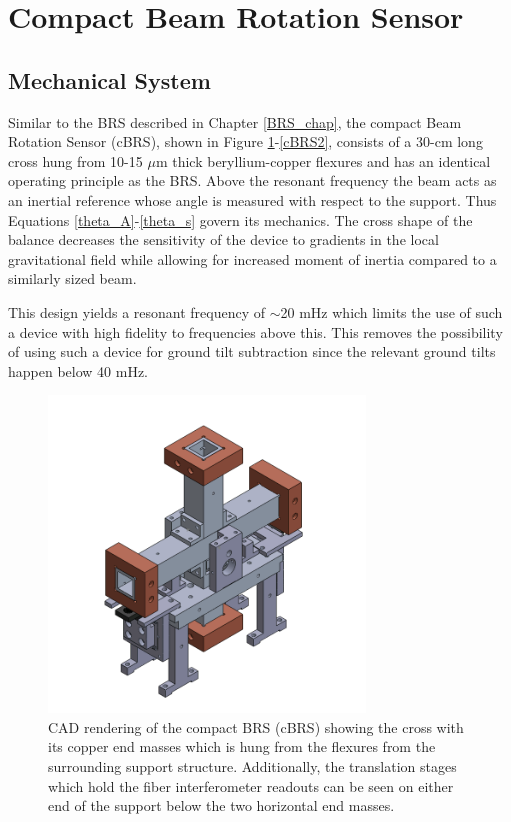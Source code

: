 \documentclass [12pt, proquest]{uwthesis}[2019]
\begin{document}
\section{Compact Beam Rotation Sensor} \label{cBRSSec}
\subsection{Mechanical System}

Similar to the BRS described in Chapter \ref{BRS_chap}, the compact Beam Rotation Sensor (cBRS), shown in Figure \ref{cBRS1}-\ref{cBRS2}, consists of a 30-cm long cross hung from 10-15 $\mu$m thick beryllium-copper flexures and has an identical operating principle as the BRS. Above the resonant frequency the beam acts as an inertial reference whose angle is measured with respect to the support. Thus Equations \ref{theta_A}-\ref{theta_s} govern its mechanics. The cross shape of the balance decreases the sensitivity of the device to gradients in the local gravitational field while allowing for increased moment of inertia compared to a similarly sized beam. 

This design yields a resonant frequency of $\sim$20 mHz which limits the use of such a device with high fidelity to frequencies above this. This removes the possibility of using such a device for ground tilt subtraction since the relevant ground tilts happen below 40 mHz. 

\begin{figure}[!h]
\begin{center}
\includegraphics[width=0.75\textwidth]{cBRSIso.png}
\end{center}
\caption[CAD rendering of the cBRS]{CAD rendering of the compact BRS (cBRS) showing the cross with its copper end masses which is hung from the flexures from the surrounding support structure. Additionally, the translation stages which hold the fiber interferometer readouts can be seen on either end of the support below the two horizontal end masses.}
\label{cBRS1}
\end{figure}
\end{document}
